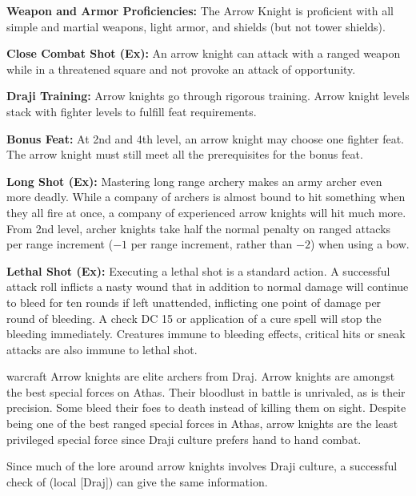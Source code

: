 {
\textbf{Weapon and Armor Proficiencies:} The Arrow Knight is proficient with all simple and martial weapons, light armor, and shields (but not tower shields).

\textbf{Close Combat Shot (Ex):} An arrow knight can attack with a ranged weapon while in a threatened square and not provoke an attack of opportunity.

\textbf{Draji Training:} Arrow knights go through rigorous training. Arrow knight levels stack with fighter levels to fulfill feat requirements. %

\textbf{Bonus Feat:} At 2nd and 4th level, an arrow knight may choose one fighter feat. The arrow knight must still meet all the prerequisites for the bonus feat.

\textbf{Long Shot (Ex):} Mastering long range archery makes an army archer even more deadly. While a company of archers is almost bound to hit something when they all fire at once, a company of experienced arrow knights will hit much more. From 2nd level, archer knights take half the normal penalty on ranged attacks per range increment ($-1$ per range increment, rather than $-2$) when using a bow.



\textbf{Lethal Shot (Ex):} Executing a lethal shot is a standard action. A successful attack roll inflicts a nasty wound that in addition to normal damage will continue to bleed for ten rounds if left unattended, inflicting one point of damage per round of bleeding. A  check DC 15 or application of a cure spell will stop the bleeding immediately. Creatures immune to bleeding effects, critical hits or sneak attacks are also immune to lethal shot.
}
{}
{warcraft}
{Arrow knights are elite archers from Draj.}
{Arrow knights are amongst the best special forces on Athas. Their bloodlust in battle is unrivaled, as is their precision. Some bleed their foes to death instead of killing them on sight.}
{Despite being one of the best ranged special forces in Athas, arrow knights are the least privileged special force since Draji culture prefers hand to hand combat.}

Since much of the lore around arrow knights involves Draji culture, a successful check of  (local [Draj]) can give the same information.